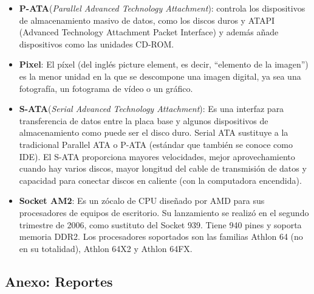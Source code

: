 \begin{itemize}
\item \textbf{P-ATA}(\textit{Parallel Advanced Technology Attachment}): controla los
 dispositivos de almacenamiento masivo de datos, como los discos duros y ATAPI 
(Advanced Technology Attachment Packet Interface) y además añade dispositivos como 
las unidades CD-ROM.

\item \textbf{Pixel}: El píxel (del inglés picture element, es decir, 
``elemento de la imagen'') es la menor unidad en la que se descompone una 
imagen digital, ya sea una fotografía, un fotograma de vídeo o un gráfico.

\item \textbf{S-ATA}(\textit{Serial Advanced Technology Attachment}): Es una interfaz
para transferencia de datos entre la placa base y algunos dispositivos de
almacenamiento como puede ser el disco duro. Serial ATA sustituye a la
tradicional Parallel ATA o P-ATA (estándar que también se conoce como IDE). El
S-ATA proporciona mayores velocidades, mejor aprovechamiento cuando hay varios
discos, mayor longitud del cable de transmisión de datos y capacidad para
conectar discos en caliente (con la computadora encendida).

\item \textbf{Socket AM2}: Es un zócalo de CPU diseñado por AMD para sus
procesadores de equipos de escritorio. Su lanzamiento se realizó en el segundo
trimestre de 2006, como sustituto del Socket 939. Tiene 940 pines y soporta
memoria DDR2. Los procesadores soportados son las familias Athlon 64 (no en su 
totalidad), Athlon 64X2
y Athlon 64FX.

\end{itemize}

\newpage
\subsection{Anexo: Reportes}

